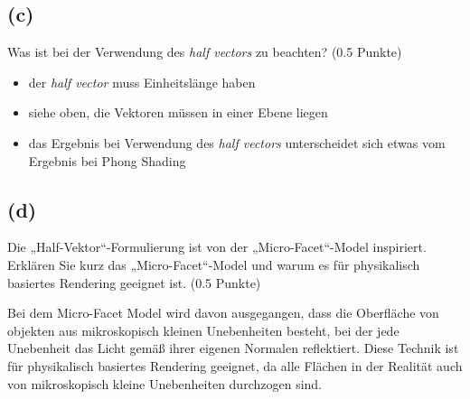 \documentclass[12pt]{scrreprt}
\begin{document}
\subsection*{(c)}
Was ist bei der Verwendung des \emph{half vectors} zu beachten? (0.5 Punkte)

\begin{itemize}
  \item der \emph{half vector} muss Einheitslänge haben
  \item siehe oben, die Vektoren müssen in einer Ebene liegen
  \item das Ergebnis bei Verwendung des \emph{half vectors} unterscheidet sich etwas vom Ergebnis bei Phong Shading
\end{itemize}


\subsection*{(d)}
Die „Half-Vektor“-Formulierung ist von der „Micro-Facet“-Model inspiriert. Erklären Sie kurz
das „Micro-Facet“-Model und warum es für physikalisch basiertes Rendering geeignet ist. (0.5
Punkte)

Bei dem Micro-Facet Model wird davon ausgegangen, dass die Oberfläche von objekten aus mikroskopisch kleinen Unebenheiten besteht, bei der jede Unebenheit das Licht gemäß ihrer eigenen Normalen reflektiert. Diese Technik ist für physikalisch basiertes Rendering geeignet, da alle Flächen in der Realität auch von mikroskopisch kleine Unebenheiten durchzogen sind.
\end{document}

